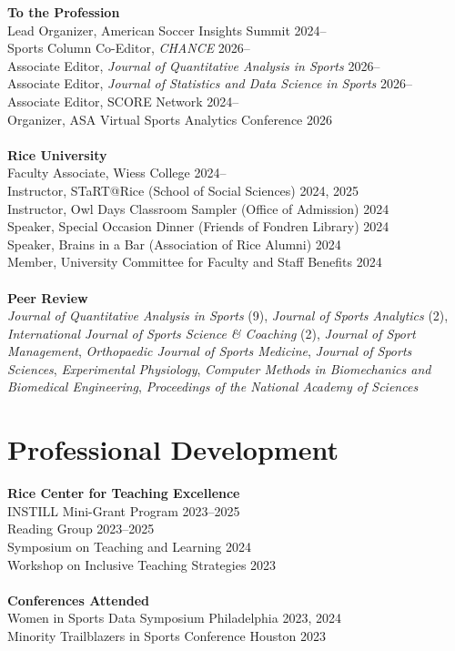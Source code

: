 \documentclass{article}
\begin{document}
{\bf To the Profession}\\
Lead Organizer, American Soccer Insights Summit \hfill 2024--\\
Sports Column Co-Editor, {\it CHANCE} \hfill 2026--\\
Associate Editor, {\it Journal of Quantitative Analysis in Sports} \hfill 2026--\\
Associate Editor, {\it Journal of Statistics and Data Science in Sports} \hfill 2026--\\
Associate Editor, SCORE Network \hfill 2024--\\
Organizer, ASA Virtual Sports Analytics Conference \hfill 2026\\
~\\
{\bf Rice University}\\
Faculty Associate, Wiess College \hfill 2024--\\
Instructor, STaRT@Rice (School of Social Sciences) \hfill 2024, 2025\\
Instructor, Owl Days Classroom Sampler (Office of Admission) \hfill 2024\\
Speaker, Special Occasion Dinner (Friends of Fondren Library) \hfill 2024\\
Speaker, Brains in a Bar (Association of Rice Alumni) \hfill 2024\\
Member, University Committee for Faculty and Staff Benefits \hfill 2024\\
~\\
{\bf Peer Review}\\
{\it Journal of Quantitative Analysis in Sports} (9), {\it Journal of Sports Analytics} (2), {\it International Journal of Sports Science \& Coaching} (2), {\it Journal of Sport Management}, {\it Orthopaedic Journal of Sports Medicine}, {\it Journal of Sports Sciences}, {\it Experimental Physiology}, {\it Computer Methods in Biomechanics and Biomedical Engineering}, {\it Proceedings of the National Academy of Sciences}

\section*{\sc Professional Development}

{\bf Rice Center for Teaching Excellence}\\
INSTILL Mini-Grant Program \hfill 2023--2025\\
Reading Group \hfill 2023--2025\\
Symposium on Teaching and Learning \hfill 2024\\
Workshop on Inclusive Teaching Strategies \hfill 2023\\
~\\
{\bf Conferences Attended}\\
Women in Sports Data Symposium \hfill Philadelphia 2023, 2024\\
Minority Trailblazers in Sports Conference \hfill Houston 2023
\end{document}
